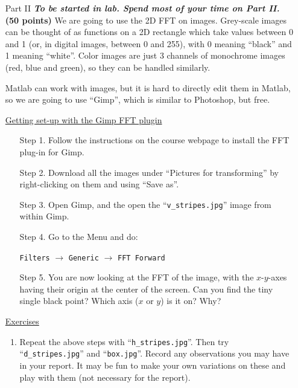 \documentclass[11pt]{amsart}
\theoremstyle{plain}
\theoremstyle{definition}
\theoremstyle{remark}
\numberwithin{equation}{section} %
\numberwithin{figure}{section}   %
\begin{document}
\begin{itemize}
\begin{enumerate}
 \end{enumerate}

\item[Part II] \textbf{\textit{To be started in lab.  Spend most of your time on Part II.}} \textbf{(50 points)} We are going to use the 2D FFT on images.  Grey-scale images can be thought of as functions on a 2D rectangle which take values between 0 and 1 (or, in digital images, between 0 and 255), with 0 meaning ``black'' and 1 meaning ``white''.  Color images are just 3 channels of monochrome images (red, blue and green), so they can be handled similarly.  

\noindent
Matlab can work with images, but it is hard to directly edit them in Matlab, so we are going to use ``Gimp'', which is similar to Photoshop, but free. 

\bigskip

\underline{Getting set-up with the Gimp FFT plugin}

\bigskip

\begin{itemize}
\item[Step 1.] Follow the instructions on the course webpage to install the FFT plug-in for Gimp.  

 \item[Step 2.] Download all the images under ``Pictures for transforming'' by right-clicking on them and using ``Save as''.  
 
 \item[Step 3.] Open Gimp, and the open the ``\texttt{v\_stripes.jpg}'' image from within Gimp.  
 
 \item[Step 4.] Go to the Menu and do: 
\begin{center}
 \texttt{Filters} $\rightarrow$ \texttt{Generic} $\rightarrow$ \texttt{FFT Forward}\end{center}
 
 \item[Step 5.] You are now looking at the FFT of the image, with the $x$-$y$-axes having their origin at the center of the screen.  Can you find the tiny single black point?  Which axis ($x$ or $y$) is it on?  Why?
\end{itemize}

\bigskip

\underline{Exercises} 

\bigskip

\begin{enumerate}
 \item Repeat the above steps with ``\texttt{h\_stripes.jpg}''.  Then try  ``\texttt{d\_stripes.jpg}'' and ``\texttt{box.jpg}''.  Record any observations you may have in your report.  It may be fun to make your own variations on these and play with them (not necessary for the report).
 

\end{enumerate}
\end{itemize}
\end{document}
